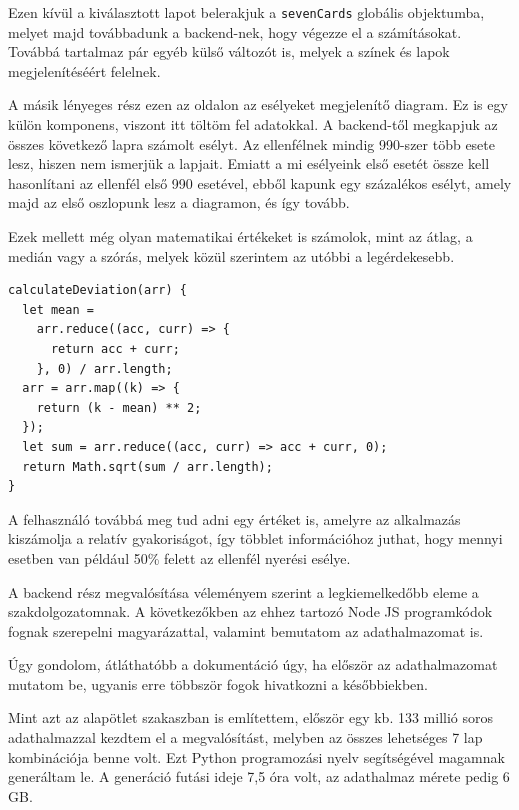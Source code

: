 Ezen kívül a kiválasztott lapot belerakjuk a \texttt{sevenCards} globális objektumba, melyet majd továbbadunk a backend-nek, hogy végezze el a számításokat. Továbbá tartalmaz pár egyéb külső változót is, melyek a színek és lapok megjelenítéséért felelnek.

A másik lényeges rész ezen az oldalon az esélyeket megjelenítő diagram. Ez is egy külön komponens, viszont itt töltöm fel adatokkal. A backend-től megkapjuk az összes következő lapra számolt esélyt. Az ellenfélnek mindig 990-szer több esete lesz, hiszen nem ismerjük a lapjait. Emiatt a mi esélyeink első esetét össze kell hasonlítani az ellenfél első 990 esetével, ebből kapunk egy százalékos esélyt, amely majd az első oszlopunk lesz a diagramon, és így tovább. 

Ezek mellett még olyan matematikai értékeket is számolok, mint az átlag, a medián vagy a szórás, melyek közül szerintem az utóbbi a legérdekesebb.

\begin{lstlisting}[style=htmlcssjs]
calculateDeviation(arr) {
  let mean =
    arr.reduce((acc, curr) => {
      return acc + curr;
    }, 0) / arr.length;
  arr = arr.map((k) => {
    return (k - mean) ** 2;
  });
  let sum = arr.reduce((acc, curr) => acc + curr, 0);
  return Math.sqrt(sum / arr.length);
}
\end{lstlisting}

A felhasználó továbbá meg tud adni egy értéket is, amelyre az alkalmazás kiszámolja a relatív gyakoriságot, így többlet információhoz juthat, hogy mennyi esetben van például 50\% felett az ellenfél nyerési esélye.


A backend rész megvalósítása véleményem szerint a legkiemelkedőbb eleme a szakdolgozatomnak. A következőkben az ehhez tartozó Node JS programkódok fognak szerepelni magyarázattal, valamint bemutatom az adathalmazomat is.


Úgy gondolom, átláthatóbb a dokumentáció úgy, ha először az adathalmazomat mutatom be, ugyanis erre többször fogok hivatkozni a későbbiekben. 

Mint azt az alapötlet szakaszban is említettem, először egy kb. 133 millió soros adathalmazzal kezdtem el a megvalósítást, melyben az összes lehetséges 7 lap kombinációja benne volt. Ezt Python programozási nyelv segítségével magamnak generáltam le. A generáció futási ideje 7,5 óra volt, az adathalmaz mérete pedig 6 GB.


